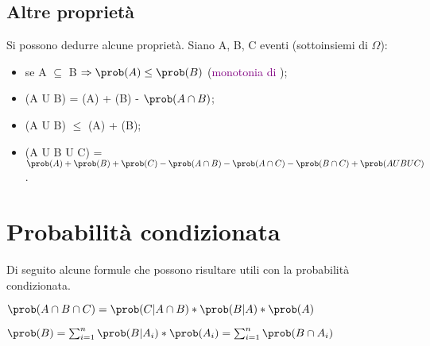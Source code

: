  \subsection{Altre proprietà}

Si possono dedurre alcune proprietà. Siano A, B, C eventi (sottoinsiemi di $\Omega$):

\begin{itemize}
    \item se A $\subseteq$ B $\Rightarrow \prob(A) \leq \prob(B)$ (\textcolor{purple}{monotonia di \prob});
    \item \prob(A U B) = \prob(A) + \prob(B) - $\prob(A \cap B)$;
    \item \prob(A U B) $\leq$ \prob(A) + \prob(B);
    \item \prob(A U B U C) = $\prob(A) + \prob(B) + \prob(C) - \prob(A \cap B) - \prob(A \cap C) - \prob(B \cap C) + \prob(A U B U C)$.
\end{itemize}

\section{Probabilità condizionata}



Di seguito alcune formule che possono risultare utili con la probabilità condizionata.


$\\\prob(A \cap B \cap C) = \prob (C|A \cap B) * \prob (B|A) * \prob (A)$


$\\\prob(B) = \sum_{i = 1}^{n} \prob (B|A_i) * \prob (A_i) = \sum_{i = 1}^{n} \prob (B \cap A_i)$

